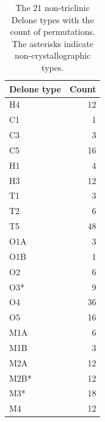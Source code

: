\documentclass[preprint]{iucr}              %
\begin{document}
	
	
	\begin{table}
		\caption{The 21 non-triclinic Delone types with the count of permutations.
			The asterisks indicate non-crystallographic types.}
		\label{table:TypeCounts}
		\begin{tabular}{lr}
			Delone type & Count    \\
			\midrule
			H4&12\\
			C1&1\\
			C3&3\\
			C5&16\\
			H1&4\\
			H3&12\\
			T1&3\\
			T2&6\\
			T5&48\\
			O1A&3\\
			O1B&1\\
			O2&6\\
			O3*&9\\
			O4&36\\
			O5&16\\
			M1A&6\\
			M1B&3\\
			M2A&12\\
			M2B*&12\\
			M3*&18\\
			M4&12\\
			\bottomrule
		\end{tabular}
	\end{table}
	
\end{document}
